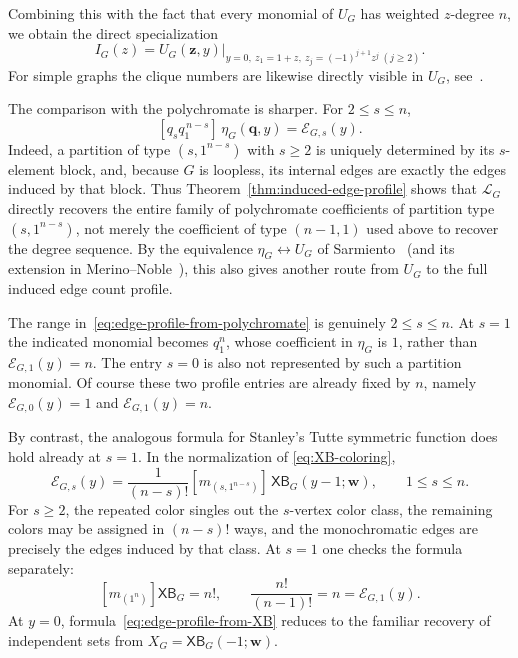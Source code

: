 \documentclass[11pt]{article}
\theoremstyle{plain}
\theoremstyle{definition}
\renewcommand{\mathcal}{\mathscr}
\newcommand{\LL}{\mathcal{L}}    %
\newcommand{\cE}{\mathcal{E}}    %
\newcommand{\bq}{\mathbf{q}}
\newcommand{\bw}{\mathbf{w}}
\newcommand{\bz}{\mathbf{z}}
\newcommand{\XB}{\mathsf{XB}} %
\numberwithin{equation}{section}
\begin{document}
Combining this with the fact that every monomial of
$U_G$ has weighted $z$-degree $n$, we obtain the direct specialization
\begin{equation}\label{eq:independence-from-U}
 I_G(z) = \left.   U_G(\bz,y) \right|_{y=0,\ z_1=1+z,\ z_j=(-1)^{j+1}z^j\ (j\ge 2)}.
\end{equation}
For simple graphs the clique numbers are likewise directly visible in
$U_G$, see~\cite[Proposition~26.38]{Nob}.

The comparison with the polychromate is sharper.  For $2\le s\le n$,
\begin{equation}\label{eq:edge-profile-from-polychromate}
   [q_s q_1^{\,n-s}]\,\eta_G(\bq,y)
   =
   \cE_{G,s}(y).
\end{equation}
Indeed, a partition of type $(s,1^{n-s})$ with $s\ge 2$ is uniquely determined
by its $s$-element block, and, because $G$ is loopless, its internal edges are
exactly the edges induced by that block.  Thus Theorem~\ref{thm:induced-edge-profile}
shows that $\LL_G$ directly recovers the entire family of polychromate
coefficients of partition type $(s,1^{n-s})$, not merely the coefficient of
type $(n-1,1)$ used above to recover the degree sequence.  By the equivalence
$\eta_G\longleftrightarrow U_G$ of Sarmiento~\cite{Sar} (and its extension in
Merino--Noble~\cite{MN}), this also gives another route from $U_G$ to the
full induced edge count profile.

The range in~\eqref{eq:edge-profile-from-polychromate} is genuinely
$2\le s\le n$.  At $s=1$ the indicated monomial becomes $q_1^n$, whose
coefficient in $\eta_G$ is $1$, rather than $\cE_{G,1}(y)=n$.
The entry $s=0$ is also not represented by such a partition monomial.
Of course these two profile entries are already fixed by
$n$, namely $\cE_{G,0}(y)=1$ and $\cE_{G,1}(y)=n$.

By contrast, the analogous formula for Stanley's Tutte symmetric function
does hold already at $s=1$.  In the normalization of
\eqref{eq:XB-coloring},
\begin{equation}\label{eq:edge-profile-from-XB}
   \cE_{G,s}(y)
   =
   \frac{1}{(n-s)!}
   [m_{(s,1^{n-s})}]\,\XB_G(y-1;\bw),
   \qquad 1\le s\le n.
\end{equation}
For $s\ge 2$, the repeated color singles out the $s$-vertex color class, the remaining colors may be assigned in $(n-s)!$ ways,
and the monochromatic edges are precisely the edges induced by that class.
At $s=1$ one checks the formula separately:
\[
   [m_{(1^n)}]\XB_G=n!,
   \qquad
   \frac{n!}{(n-1)!}=n=\cE_{G,1}(y).
\]
At $y=0$, formula~\eqref{eq:edge-profile-from-XB} reduces to the familiar
recovery of independent sets from $X_G=\XB_G(-1;\bw)$.
\end{document}
